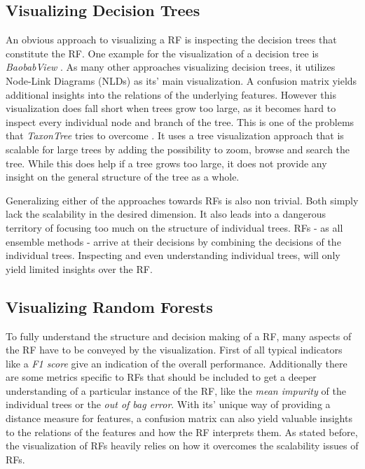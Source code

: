 \documentclass[a4paper, 12pt]{article}
\begin{document}
\subsection{Visualizing Decision Trees}
An obvious approach to visualizing a RF is inspecting the decision trees that constitute
the RF. One example for the visualization of a decision tree is \textit{BaobabView}
\cite{van2011baobabview}. As many other approaches visualizing decision trees, it utilizes
Node-Link Diagrams (NLDs) as its' main visualization. A confusion matrix yields additional
insights into the relations of the underlying features.
However this visualization does fall short when trees grow too large, as it becomes hard to
inspect every individual node and branch of the tree.
This is one of the problems that \textit{TaxonTree} tries to overcome
\cite{parr2003taxontree}. It uses a tree visualization approach that is scalable for large
trees by adding the possibility to zoom, browse and search the tree. While this does
help if a tree grows too large, it does not provide any insight on the general structure of
the tree as a whole. \par

Generalizing either of the approaches towards RFs is also non trivial. Both simply lack the
scalability in the desired dimension. It also leads into a dangerous territory of focusing too much on
the structure of individual trees. RFs - as all ensemble methods - arrive at their decisions
by combining the decisions of the individual trees. Inspecting and even understanding
individual trees, will only yield limited insights over the RF.

\subsection{Visualizing Random Forests}
To fully understand the structure and decision making of a RF, many aspects of the RF have to
be conveyed by the visualization. First of all typical indicators like a \textit{F1 score}
give an indication of the overall performance. Additionally there are some metrics specific
to RFs that should be included to get a deeper understanding of a particular instance of the
RF, like the \textit{mean impurity} of the individual trees or the \textit{out of bag error}.
With its' unique way of providing a distance measure for features,
a confusion matrix can also yield valuable insights to the relations of the features and how
the RF interprets them. As stated before, the visualization of RFs heavily relies on how it
overcomes the scalability issues of RFs.
\end{document}
